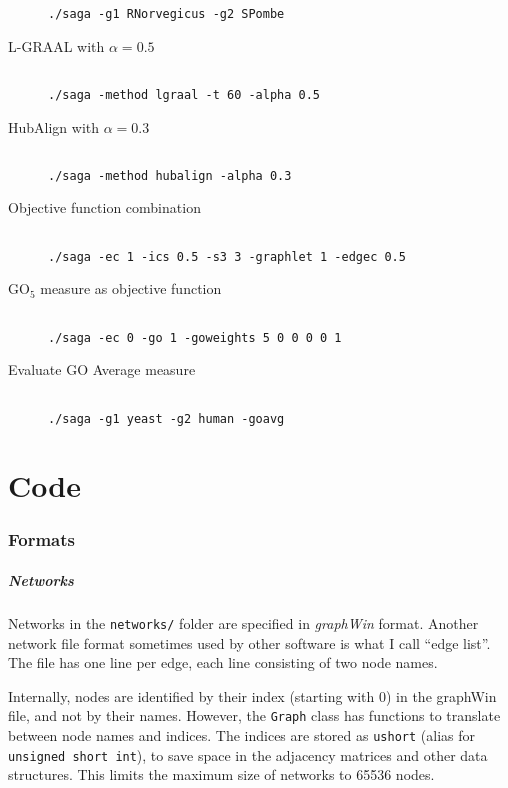 \documentclass[]{article}
\begin{document}
\begin{description}
\begin{verbatim}
./saga -g1 RNorvegicus -g2 SPombe
\end{verbatim}
\item[L-GRAAL with $\alpha=0.5$]
\begin{verbatim}

./saga -method lgraal -t 60 -alpha 0.5
\end{verbatim}
\item[HubAlign with $\alpha=0.3$]
\begin{verbatim}

./saga -method hubalign -alpha 0.3
\end{verbatim}
\item[Objective function combination]
\begin{verbatim}

./saga -ec 1 -ics 0.5 -s3 3 -graphlet 1 -edgec 0.5
\end{verbatim}
\item[$\mbox{GO}_5$ measure as objective function]
\begin{verbatim}

./saga -ec 0 -go 1 -goweights 5 0 0 0 0 1
\end{verbatim}
\item[Evaluate GO Average measure]
\begin{verbatim}

./saga -g1 yeast -g2 human -goavg
\end{verbatim}
\end{description}

\part{Code}

\section{Formats}\label{formats}
\subsubsection*{Networks}
Networks in the \texttt{networks/} folder are specified in \textit{graphWin} format. Another network file format sometimes used by other software is what I call ``edge list''. The file has one line per edge, each line consisting of two node names.

Internally, nodes are identified by their index (starting with 0) in the graphWin file, and not by their names. However, the \texttt{Graph} class has functions to translate between node names and indices. The indices are stored as \texttt{ushort} (alias for \texttt{unsigned short int}), to save space in the adjacency matrices and other data structures. This limits the maximum size of networks to 65536 nodes.
\end{document}
